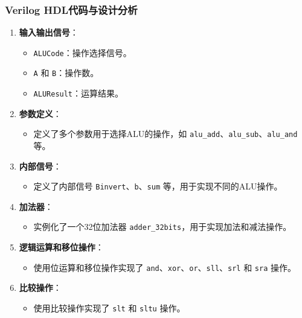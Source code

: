 \documentclass[12pt,hyperref,a4paper,UTF8]{ctexart}
\begin{document}
\subsubsection*{\Large Verilog HDL代码与设计分析}
\normalsize

\begin{enumerate}
    \item \textbf{输入输出信号}：
    \begin{itemize}
        \item \texttt{ALUCode}：操作选择信号。
        \item \texttt{A} 和 \texttt{B}：操作数。
        \item \texttt{ALUResult}：运算结果。
    \end{itemize}

    \item \textbf{参数定义}：
    \begin{itemize}
        \item 定义了多个参数用于选择ALU的操作，如 \texttt{alu\_add}、\texttt{alu\_sub}、\texttt{alu\_and} 等。
    \end{itemize}

    \item \textbf{内部信号}：
    \begin{itemize}
        \item 定义了内部信号 \texttt{Binvert}、\texttt{b}、\texttt{sum} 等，用于实现不同的ALU操作。
    \end{itemize}

    \item \textbf{加法器}：
    \begin{itemize}
        \item 实例化了一个32位加法器 \texttt{adder\_32bits}，用于实现加法和减法操作。
    \end{itemize}

    \item \textbf{逻辑运算和移位操作}：
    \begin{itemize}
        \item 使用位运算和移位操作实现了 \texttt{and}、\texttt{xor}、\texttt{or}、\texttt{sll}、\texttt{srl} 和 \texttt{sra} 操作。
    \end{itemize}

    \item \textbf{比较操作}：
    \begin{itemize}
        \item 使用比较操作实现了 \texttt{slt} 和 \texttt{sltu} 操作。
    \end{itemize}


\end{enumerate}
\end{document}
